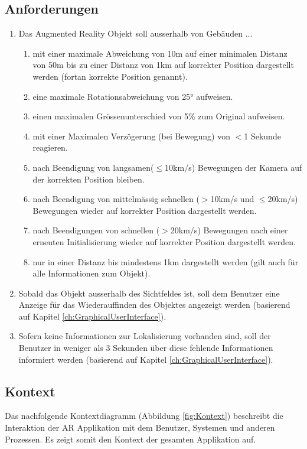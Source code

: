 \documentclass[a4paper]{scrreprt}
\begin{document}
\subsection{Anforderungen}
\label{ch:Anforderungen}
\begin{enumerate}
	\item Das Augmented Reality Objekt soll ausserhalb von Gebäuden ...
	\begin{enumerate}[label*=\arabic*.]
		\item mit einer maximale Abweichung von 10m auf einer minimalen Distanz von 50m bis zu einer Distanz von 1km auf korrekter Position dargestellt werden (fortan korrekte Position genannt).
		\item eine maximale Rotationsabweichung von \ang{25} aufweisen.
		\item einen maximalen Grössenunterschied von 5\% zum Original aufweisen.
		\item mit einer Maximalen Verzögerung (bei Bewegung) von $<$1 Sekunde reagieren.
		\item nach Beendigung von langsamen($\leq$10km/s) Bewegungen der Kamera auf der korrekten Position bleiben.
		\item nach Beendigung von mittelmässig schnellen ($>$10km/s und $\leq$20km/s) Bewegungen wieder auf korrekter Position dargestellt werden.
		\item nach Beendigungen von schnellen ($>$20km/s) Bewegungen nach einer erneuten Initialisierung wieder auf korrekter Position dargestellt werden.
		\item nur in einer Distanz bis mindestens 1km dargestellt werden (gilt auch für alle Informationen zum Objekt).
	\end{enumerate}
	\item Sobald das Objekt ausserhalb des Sichtfeldes ist, soll dem Benutzer eine Anzeige für das Wiederauffinden des Objektes angezeigt werden (basierend auf Kapitel \ref{ch:GraphicalUserInterface}).
	\item Sofern keine Informationen zur Lokalisierung vorhanden sind, soll der Benutzer in weniger als 3 Sekunden über diese fehlende Informationen informiert werden (basierend auf Kapitel \ref{ch:GraphicalUserInterface}).
\end{enumerate}

\subsection{Kontext}
Das nachfolgende Kontextdiagramm (Abbildung \ref{fig:Kontext}) beschreibt die Interaktion der AR Applikation mit dem Benutzer, Systemen und anderen Prozessen. Es zeigt somit den Kontext der gesamten Applikation auf.
\end{document}
